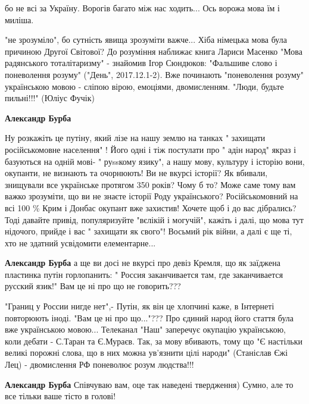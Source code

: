 \begin{itemize}
бо не всі за Україну. Ворогів багато між нас ходить... Ось ворожа мова їм і миліша.


"не зрозуміло", бо сутність явища зрозуміти важче... Хіба німецька мова була
причиною Другої Світової? До розуміння наближає книга Лариси Масенко "Мова
радянського тоталітаризму" - знайомив Ігор Сюндюков: "Фальшиве слово і
поневолення розуму" ("День", 2017.12.1-2). Вже починають "поневолення розуму"
українською мовою - сліпою вірою, емоціями, двомисленням. "Люди, будьте
пильні!!!" (Юліус Фучік)

\begin{itemize} %
\textbf{Александр Бурба} 

Ну розкажіть це путіну, який лізе на нашу землю на танках " захищати
російськомовне населення" ! Його одні і тіж постулати про " адін народ" якраз і
базуються на одній мові- " руssкому язику", а нашу мову, культуру і історію
вони, окупанти, не визнають та очорнюють! Ви не вкурсі історії? Як вбивали,
знищували все українське протягом 350 років? Чому б то? Може саме тому вам
важко зрозуміти, що ви не знаєте історії Роду українського? Російськомовний на
всі 100 \% Крим і Донбас окупант вже захистив! Хочете щоб і до вас дібрались?
Тоді давайте привід, популяризуйте "вєлікій і могучій", кажіть і далі, що мова
тут нідочого, прийде і вас " захищати як свого"! Восьмий рік війни, а далі є ще
ті, хто не здатний усвідомити елементарне...


\textbf{Александр Бурба} а ще ви досі не вкурсі про девіз Кремля, що як заїджена пластинка путін горлопанить: " Россия заканчивается там, где заканчивается русский язик!" Вам це ні про що не говорить???


"Границ у России нигде нет",- Путін, як він це хлопчині каже, в Інтернеті
повторюють іноді. "Вам це ні про що..."??? Про єдиний народ його стаття була
вже українською мовою... Телеканал "Наш" заперечує окупацію українською, коли
дебати - С.Таран та Є.Мураєв. Так, за мову вбивають, тому що "Є настільки
великі порожні слова, що в них можна ув'язнити цілі народи" (Станіслав Єжі Лец)
- двомислення РФ поневолює розум людства!!!

\begin{itemize} %
\textbf{Александр Бурба} Співчуваю вам, оце так наведені твердження) Сумно, але то все тільки ваше тісто в голові!


\end{itemize}
\end{itemize}
\end{itemize}
